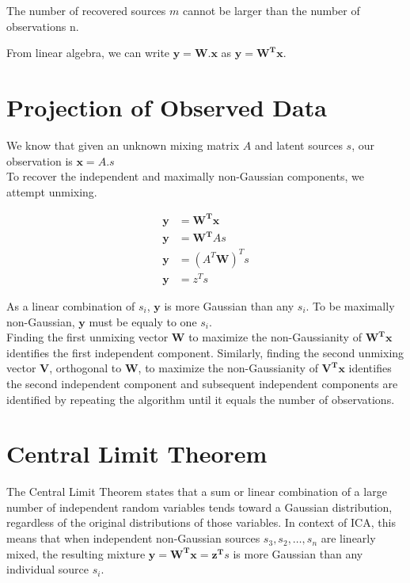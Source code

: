 \documentclass[12pt]{article}
\newcommand{\x}{\bm{x}}
\numberwithin{equation}{section}
\begin{document}
The number of recovered sources $m$ cannot be larger than the number of observations n. 

From linear algebra, we can write $\mathbf{y} = \mathbf{W}.\x$ as $\mathbf{y} = \mathbf{W^T}\x$. 
\section*{Projection of Observed Data}

We know that given an unknown mixing matrix $A$ and latent sources $s$, our observation is $\x = A . s$ \\

To recover the independent and maximally non-Gaussian components, we attempt unmixing.

\begin{align*}
\mathbf{y} &= \mathbf{W^T}\x \\
\mathbf{y} &= \mathbf{W^T} A s \\
\mathbf{y} &= (A^T \mathbf{W})^T s \\
\mathbf{y} &= z^Ts
\end{align*}

As a linear combination of $s_i$, $\mathbf{y}$ is more Gaussian than any $s_i$. To be maximally non-Gaussian, $\mathbf{y}$ must be equaly to one $s_i$. \\

Finding the first unmixing vector $\mathbf{W}$ to maximize the non-Gaussianity of $\mathbf{W^T}\x$ identifies the first independent component. Similarly, finding the second unmixing vector  $\mathbf{V}$, orthogonal to $\mathbf{W}$, to maximize the non-Gaussianity of $\mathbf{V^T}\x$ identifies the second independent component and subsequent independent components are identified by repeating the algorithm until it equals the number of observations.

\section*{Central Limit Theorem}
The Central Limit Theorem states that a sum or linear combination of a large number of independent random variables tends toward a Gaussian distribution, regardless of the original distributions of those variables. In context of ICA, this means that when independent non-Gaussian sources $s_3, s_2, …, s_n$ are linearly mixed, the resulting mixture $\mathbf{y} = \mathbf{W^T}\x = \mathbf{z^T}s$ is more Gaussian than any individual source $s_i$. 
\end{document}
